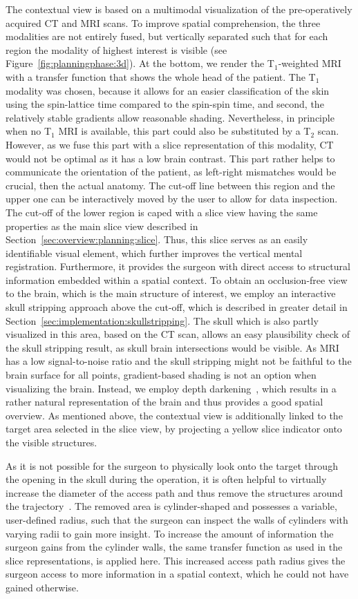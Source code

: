 \documentclass{vgtc}                          %
\begin{document}
The contextual view is based on a multimodal visualization of the pre-operatively acquired CT and MRI scans. To improve spatial comprehension, the three modalities are not entirely fused, but vertically separated such that for each region the modality of highest interest is visible (see Figure~\ref{fig:planningphase:3d}). At the bottom, we render the T$_1$-weighted MRI with a transfer function that shows the whole head of the patient. The T$_1$ modality was chosen, because it allows for an easier classification of the skin using the spin-lattice time compared to the spin-spin time, and second, the relatively stable gradients allow reasonable shading. Nevertheless, in principle when no T$_1$ MRI is available, this part could also be substituted by a T$_2$ scan. However, as we fuse this part with a slice representation of this modality, CT would not be optimal as it has a low brain contrast. This part rather helps to communicate the orientation of the patient, as left-right mismatches would be crucial, then the actual anatomy. The cut-off line between this region and the upper one can be interactively moved by the user to allow for data inspection. The cut-off of the lower region is caped with a slice view having the same properties as the main slice view described in Section~\ref{sec:overview:planning:slice}. Thus, this slice serves as an easily identifiable visual element, which further improves the vertical mental registration. Furthermore, it provides the surgeon with direct access to structural information embedded within a spatial context. To obtain an occlusion-free view to the brain, which is the main structure of interest, we employ an interactive skull stripping approach above the cut-off, which is described in greater detail in Section~\ref{sec:implementation:skullstripping}. The skull which is also partly visualized in this area, based on the CT scan, allows an easy plausibility check of the skull stripping result, as skull brain intersections would be visible. As MRI has a low signal-to-noise ratio and the skull stripping might not be faithful to the brain surface for all points, gradient-based shading is not an option when visualizing the brain. Instead, we employ depth darkening~\cite{Luft2005}, which results in a rather natural representation of the brain and thus provides a good spatial overview. As mentioned above, the contextual view is additionally linked to the target area selected in the slice view, by projecting a yellow slice indicator onto the visible structures.

As it is not possible for the surgeon to physically look onto the target through the opening in the skull during the operation, it is often helpful to virtually increase the diameter of the access path and thus remove the structures around the trajectory~\cite{Weiskopf2002,Rieder2008}. The removed area is cylinder-shaped and possesses a variable, user-defined radius, such that the surgeon can inspect the walls of cylinders with varying radii to gain more insight. To increase the amount of information the surgeon gains from the cylinder walls, the same transfer function as used in the slice representations, is applied here. This increased access path radius gives the surgeon access to more information in a spatial context, which he could not have gained otherwise.
\end{document}
